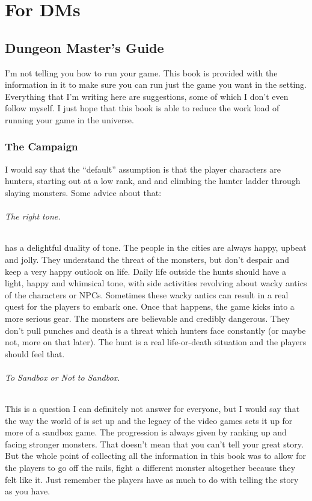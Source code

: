 \renewcommand*{\hbPartCover}{assets/ext/forest-sleeps}
\part{For DMs}

\chapter{Dungeon Master's Guide}
I'm not telling you how to run your game. This book is provided with the information in it to make sure you can run just the game you want in the setting. Everything that I'm writing here are suggestions, some of which I don't even follow myself. I just hope that this book is able to reduce the work load of running your game in the \MH{} universe.

\section{The Campaign}
I would say that the ``default'' assumption is that the player characters are hunters, starting out at a low rank, and and climbing the hunter ladder through slaying monsters. Some advice about that:

\paragraph{The right tone.} \MH{} has a delightful duality of tone. The people in the cities are always happy, upbeat and jolly. They understand the threat of the monsters, but don't despair and keep a very happy outlook on life. Daily life outside the hunts should have a light, happy and whimsical tone, with side activities revolving about wacky antics of the characters or NPCs. Sometimes these wacky antics can result in a real quest for the players to embark one. Once that happens, the game kicks into a more serious gear. The monsters are believable and credibly dangerous. They don't pull punches and death is a threat which hunters face constantly (or maybe not, more on that later). The hunt is a real life-or-death situation and the players should feel that.

\paragraph{To Sandbox or Not to Sandbox.} This is a question I can definitely not answer for everyone, but I would say that the way the world of \MH{} is set up and the legacy of the video games sets it up for more of a sandbox game. The progression is always given by ranking up and facing stronger monsters. That doesn't mean that you can't tell your great story. But the whole point of collecting all the information in this book was to allow for the players to go off the rails, fight a different monster altogether because they felt like it. Just remember the players have as much to do with telling the story as you have.

